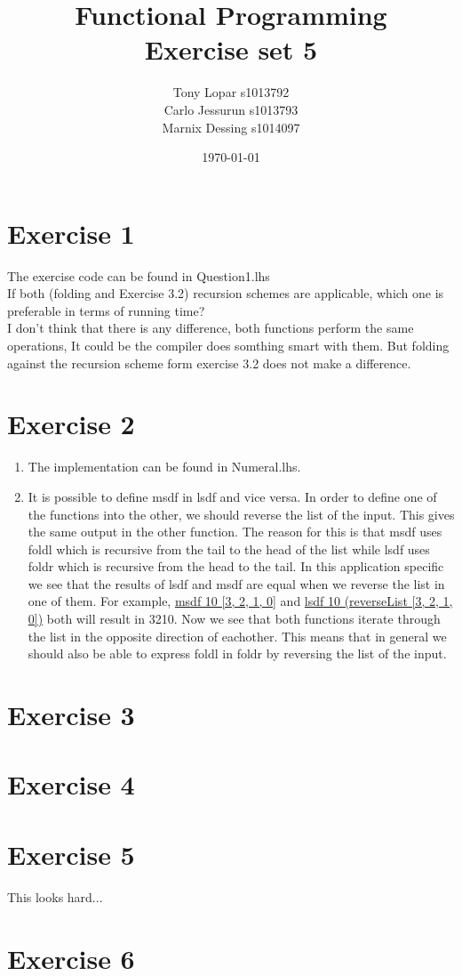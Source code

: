 \documentclass{article}
\begin{document}
\title{Functional Programming \\ Exercise set 5}
\date{\today}
\author{Tony Lopar s1013792 \\ Carlo Jessurun s1013793 \\ Marnix Dessing s1014097}
\maketitle

\section*{Exercise 1}
The exercise code can be found in Question1.lhs\\
If both (folding and Exercise 3.2) recursion schemes are applicable,
which one is preferable in terms of running time?\\
I don't think that there is any difference, both functions perform the same operations,
It could be the compiler does somthing smart with them. But folding against the
recursion scheme form exercise 3.2 does not make a difference.

\section*{Exercise 2}
\begin{enumerate}
  \item The implementation can be found in Numeral.lhs.
  \item It is possible to define msdf in lsdf and vice versa. In order to define one of the functions into the other, we should reverse the list of the input. This gives the same output in the other function. The reason for this is that msdf uses foldl which is recursive from the tail to the head of the list while lsdf uses foldr which is recursive from the head to the tail. In this application specific we see that the results of lsdf and msdf are equal when we reverse the list in one of them. For example, \underline{msdf 10 [3, 2, 1, 0]} and \underline{lsdf 10 (reverseList [3, 2, 1, 0])} both will result in 3210.
   Now we see that both functions iterate through the list in the opposite direction of eachother. This means that in general we should also be able to express foldl in foldr by reversing the list of the input.
\end{enumerate}
\section*{Exercise 3}
\section*{Exercise 4}
\section*{Exercise 5}
This looks hard...
\section*{Exercise 6}
\end{document}
